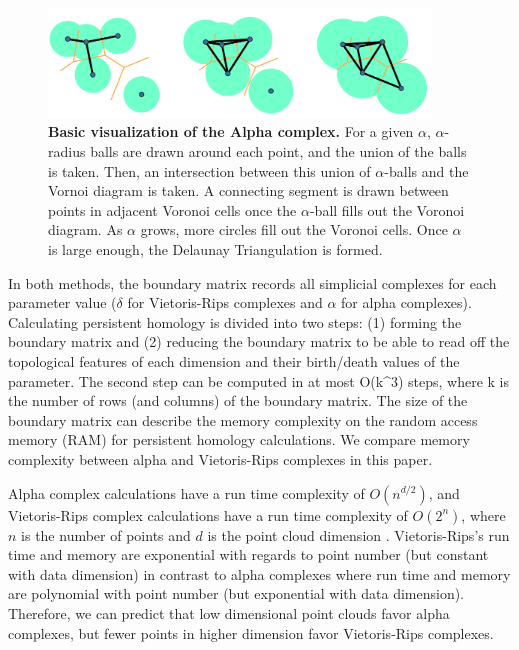 \begin{figure}[b]
  \centering
  \includegraphics[width=4in]{fig2.png}
  \caption{\textbf{Basic visualization of the Alpha complex.}
  For a given $\alpha$, $\alpha$-radius balls are drawn around each point, and the union of the balls is taken.
  Then, an intersection between this union of $\alpha$-balls and the Vornoi diagram is taken.
  A connecting segment is drawn between points in adjacent Voronoi cells once the $\alpha$-ball fills out the Voronoi diagram.
  As $\alpha$ grows, more circles fill out the Voronoi cells.
  Once $\alpha$ is large enough, the Delaunay Triangulation is formed.}
\end{figure}

In both methods, the boundary matrix records all simplicial complexes
for each parameter value (\(\delta\) for Vietoris-Rips complexes and
\(\alpha\) for alpha complexes). Calculating persistent homology is
divided into two steps: (1) forming the boundary matrix and (2)
reducing the boundary matrix to be able to read off the topological
features of each dimension and their birth/death values of the
parameter. The second step can be computed in at most O(k\^{}3) steps,
where k is the number of rows (and columns) of the boundary matrix. The
size of the boundary matrix can describe the memory complexity on the
random access memory (RAM) for persistent homology calculations. We
compare memory complexity between alpha and Vietoris-Rips complexes in
this paper.

Alpha complex calculations have a run time complexity of \(O(n^{d/2})\),
and Vietoris-Rips complex calculations have a run time complexity of
\(O(2^n)\), where \(n\) is the number of points and \(d\) is the point
cloud dimension \citep{roadmap}. Vietoris-Rips's run time and memory are
exponential with regards to point number (but constant with data
dimension) in contrast to alpha complexes where run time and memory are
polynomial with point number (but exponential with data dimension).
Therefore, we can predict that low dimensional point clouds favor alpha
complexes, but fewer points in higher dimension favor Vietoris-Rips
complexes.

